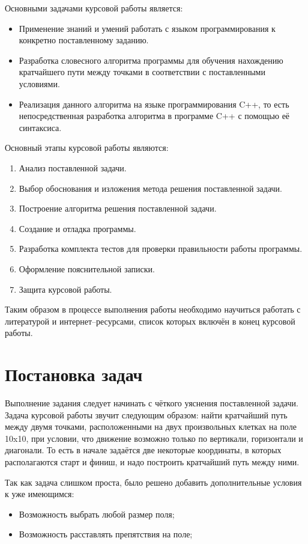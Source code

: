 \documentclass[12pt,chapterprefix=true,headings=onelineappendix]{scrartcl}
\begin{document}
Основными задачами курсовой работы является:
\begin{itemize}
	\item Применение знаний и умений работать с языком программирования к
	      конкретно поставленному заданию.
	\item Разработка словесного алгоритма программы для обучения нахождению
	      кратчайшего пути между точками в соответствии с поставленными условиями.
	\item Реализация данного алгоритма на языке программирования C++, то есть
	      непосредственная разработка алгоритма в программе C++ с помощью её
	      синтаксиса.
\end{itemize}

Основный этапы курсовой работы являются:
\begin{enumerate}
	\item Анализ поставленной задачи.
	\item Выбор обоснования и изложения метода решения поставленной задачи.
	\item Построение алгоритма решения поставленной задачи.
	\item Создание и отладка программы.
	\item Разработка комплекта тестов для проверки правильности работы программы.
	\item Оформление пояснительной записки.
	\item Защита курсовой работы.
\end{enumerate}

Таким образом в процессе выполнения работы необходимо научиться работать с
литературой и интернет--ресурсами, список которых включён в конец курсовой
работы.


\newpage{}
\section{Постановка задач}
Выполнение задания следует начинать с чёткого уяснения поставленной задачи.
Задача курсовой работы звучит следующим образом: найти кратчайший путь между
двумя точками, расположенными на двух произвольных клетках на поле 10x10, при
условии, что движение возможно только по вертикали, горизонтали и диагонали. То
есть в начале задаётся две некоторые координаты, в которых располагаются старт
и финиш, и надо построить кратчайший путь между ними.

Так как задача слишком проста, было решено добавить дополнительные условия к
уже имеющимся:
\begin{itemize}
	\item Возможность выбрать любой размер поля;
	\item Возможность расставлять препятствия на поле;
\end{itemize}
\end{document}
